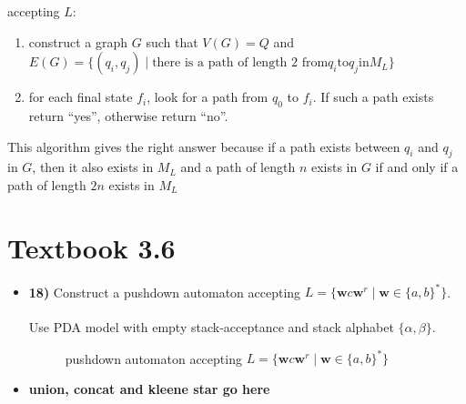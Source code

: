 \documentclass[defaultpackages]{simplereport}
\begin{document}
\begin{itemize}[label=]
    accepting $L$:
    \begin{enumerate}
      \item construct a graph $G$ such that $V(G) = Q$ and $E(G) = \{(q_i, q_j)
        \mid \text{there is a path of length 2 from} q_i \text{to} q_j \text{in}
        M_L\}$
       \item for each final state $f_i$, look for a path from $q_0$ to $f_i$. If
         such a path exists return ``yes'', otherwise return ``no''. 
      \end{enumerate}
   This algorithm gives the right answer because if a path exists between $q_i$
   and $q_j$ in $G$, then it also exists in $M_L$ and a path of length $n$
   exists in $G$ if and only if a path of length $2n$ exists in $M_L$
\end{itemize}
\section*{Textbook 3.6}
\begin{itemize}[label=]
  \item \textbf{18)} Construct a pushdown automaton accepting $L =
    \{\textbf{w}c\textbf{w}^r \mid \textbf{w} \in \{a, b\}^*\}$.\\\\
    Use PDA model with empty stack-acceptance and stack alphabet $\{\alpha, \beta\}$.
    \begin{figure}[H]
     \centering
     \caption{pushdown automaton accepting $L = \{\textbf{w}c\textbf{w}^r \mid \textbf{w} \in \{a, b\}^*\}$}
     \end{figure}
   \item \textbf{union, concat and kleene star go here}
\end{itemize}
\end{document}
